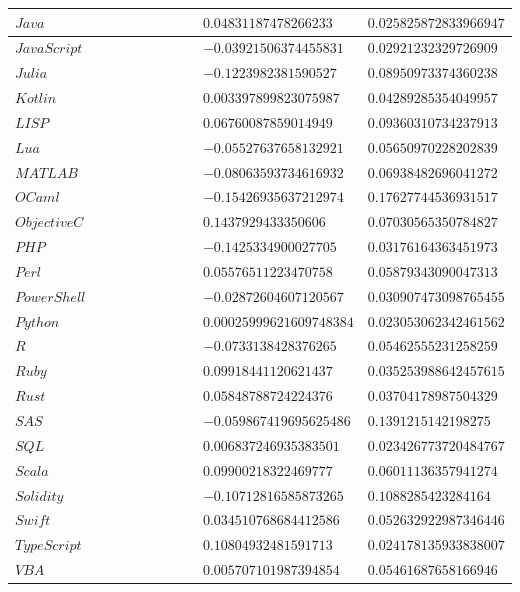 \documentclass{report}
\begin{document}
\begin{longtable}{|R{0.4\linewidth}|R{0.3\linewidth}|R{0.3\linewidth}|}
  \hline
  $Java$ & $0.04831187478266233$ & $0.025825872833966947$\\
  \hline
  $JavaScript$ & $-0.03921506374455831$ & $0.02921232329726909$\\
  \hline
  $Julia$ & $-0.1223982381590527$ & $0.08950973374360238$\\
  \hline
  $Kotlin$ & $0.003397899823075987$ & $0.04289285354049957$\\
  \hline
  $LISP$ & $0.06760087859014949$ & $0.09360310734237913$\\
  \hline
  $Lua$ & $-0.05527637658132921$ & $0.05650970228202839$\\
  \hline
  $MATLAB$ & $-0.08063593734616932$ & $0.06938482696041272$\\
  \hline
  $OCaml$ & $-0.15426935637212974$ & $0.17627744536931517$\\
  \hline
  $ObjectiveC$ & $0.1437929433350606$ & $0.07030565350784827$\\
  \hline
  $PHP$ & $-0.1425334900027705$ & $0.03176164363451973$\\
  \hline
  $Perl$ & $0.05576511223470758$ & $0.05879343090047313$\\
  \hline
  $PowerShell$ & $-0.02872604607120567$ & $0.030907473098765455$\\
  \hline
  $Python$ & $0.00025999621609748384$ & $0.023053062342461562$\\
  \hline
  $R$ & $-0.0733138428376265$ & $0.05462555231258259$\\
  \hline
  $Ruby$ & $0.09918441120621437$ & $0.035253988642457615$\\
  \hline
  $Rust$ & $0.05848788724224376$ & $0.03704178987504329$\\
  \hline
  $SAS$ & $-0.059867419695625486$ & $0.1391215142198275$\\
  \hline
  $SQL$ & $0.006837246935383501$ & $0.023426773720484767$\\
  \hline
  $Scala$ & $0.09900218322469777$ & $0.06011136357941274$\\
  \hline
  $Solidity$ & $-0.10712816585873265$ & $0.1088285423284164$\\
  \hline
  $Swift$ & $0.034510768684412586$ & $0.052632922987346446$\\
  \hline
  $TypeScript$ & $0.10804932481591713$ & $0.024178135933838007$\\
  \hline
  $VBA$ & $0.005707101987394854$ & $0.05461687658166946$ \\
  \hline
\end{longtable}
\end{document}
